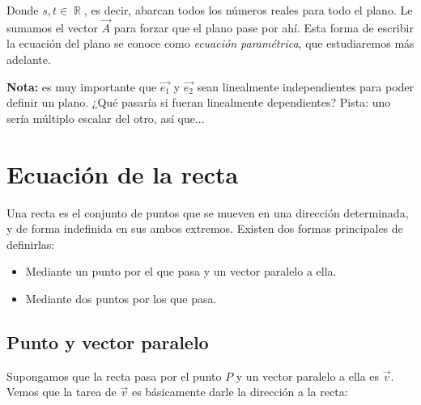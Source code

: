 \documentclass[12pt, fleqn]{report}                             %
\newcommand \Quote {\qq}                                        %
\DeclareMathOperator \Reals        {\mathbb{R}}                 %
\newcommand{\lVec}[1]{\overrightarrow{#1}}                      %
\begin{document}
    		Donde $s, t \in \Reals$, es decir, abarcan todos los números reales para \Quote{barrer} todo el plano. Le sumamos el vector $\vec{A}$ para forzar que el plano pase por ahí. Esta forma de escribir la ecuación del plano se conoce como \emph{ecuación paramétrica}, que estudiaremos más adelante.
    		
    		\textbf{Nota:} es muy importante que $\lVec{e_1}$ y $\lVec{e_2}$ sean linealmente independientes para poder definir un plano. ¿Qué pasaría si fueran linealmente dependientes? Pista: uno sería múltiplo escalar del otro, así que...
    		
    	
    	\clearpage
            
        \section{Ecuación de la recta}
        
        Una recta es el conjunto de puntos que se mueven en una dirección determinada, y de forma indefinida en sus ambos extremos. Existen dos formas principales de definirlas: \begin{itemize}\setlength\itemsep{0em}
        	\item Mediante un punto por el que pasa y un vector paralelo a ella.
        	\item Mediante dos puntos por los que pasa.
        \end{itemize}
    
    		
    		\clearpage
    
    		\subsection{Punto y vector paralelo}
    		
    		Supongamos que la recta pasa por el punto $P$ y un vector paralelo a ella es $\vec{v}$. Vemos que la tarea de $\vec{v}$ es básicamente darle la dirección a la recta:
    		
\end{document}
